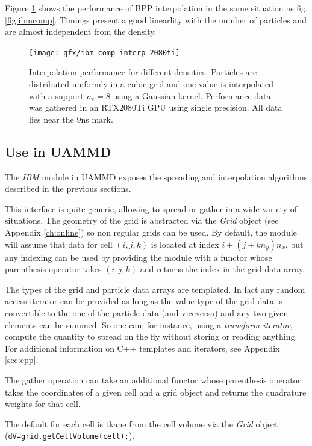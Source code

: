 \documentclass[ twoside,openright,titlepage,numbers=noenddot,%
headinclude,footinclude,cleardoublepage=empty,abstract=on,
BCOR=5mm,paper=a4,fontsize=11pt, dvipsnames
]{scrreprt}
\def\ucpp{uammd_cpp_lexer.py:UAMMDCppLexer -x}
\newcommand{\uammd}{\gls{UAMMD}\xspace}
\newcommand{\gpu}{\gls{GPU}\xspace}
\begin{document}
Figure \ref{fig:ibmcompinterp} shows the performance of BPP interpolation in the same situation as fig. \ref{fig:ibmcomp}. Timings present a good linearlity with the number of particles and are almost independent from the density. 
\begin{figure}[h]
  \centering
\texttt{[image: gfx/ibm\_comp\_interp\_2080ti]}
\caption{Interpolation performance for different densities. Particles are distributed uniformly in a cubic grid and one value is interpolated with a support $n_s=8$ using a Gaussian kernel. Performance data was gathered in an RTX2080Ti \gpu using single precision. All data lies near the 9ns mark.}
  \label{fig:ibmcompinterp}
\end{figure}


\subsection*{Use in UAMMD}

The \emph{IBM} module in \uammd exposes the spreading and interpolation algorithms described in the previous sections.

This interface is quite generic, allowing to spread or gather in a wide variety of situations. The geometry of the grid is abstracted via the \emph{Grid} object (see Appendix \ref{ch:online}) so non regular grids can be used. By default, the module will assume that data for cell $(i,j,k)$ is located at index $i+(j+kn_y)n_x$, but any indexing can be used by providing the module with a functor whose parenthesis operator takes $(i,j,k)$ and returns the index in the grid data array.

The types of the grid and particle data arrays are templated. In fact any random access iterator can be provided as long as the value type of the grid data is convertible to the one of the particle data (and viceversa) and any two given elements can be summed. So one can, for instance, using a \emph{transform iterator},  compute the quantity to spread on the fly without storing or reading anything. For additional information on C++ templates and iterators, see Appendix \ref{sec:cpp}.

The gather operation can take an additional functor whose parenthesis operator takes the coordinates of a given cell and a grid object and returns the quadrature weights for that cell.

The default for each cell is tkane from the cell volume via the \emph{Grid} object (\texttt{dV=grid.getCellVolume(cell);}).
\end{document}
